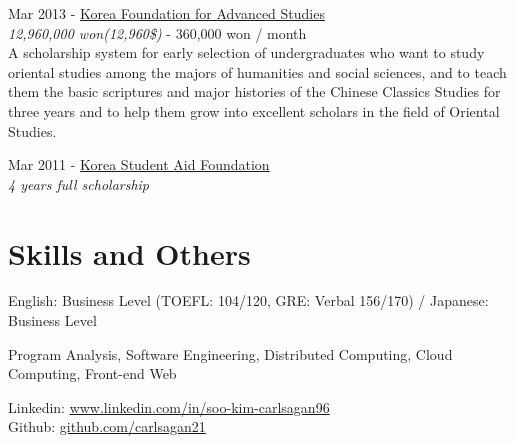 \documentclass[10pt]{article} %
\begin{document}
{
Mar 2013 - \href{http://www.kfas.or.kr/?pCulture=en}{Korea Foundation for Advanced Studies}\\
\textit{12,960,000 won(12,960\$)} - 360,000 won / month\\
A scholarship system for early selection of undergraduates who want to study oriental studies among the majors of humanities and social sciences, and to teach them the basic scriptures and major histories of the Chinese Classics Studies for three years and to help them grow into excellent scholars in the field of Oriental Studies.
}

{
Mar 2011 - \href{http://eng.kosaf.go.kr/jsp/main.jsp}{Korea Student Aid Foundation}\\
\textit{4 years full scholarship}\\
}
\fi


\section{Skills and Others}

\if{}
{
English: Business Level (TOEFL: 104/120, GRE: Verbal 156/170) / Japanese: Business Level
}
\fi

{
Program Analysis, Software Engineering, Distributed Computing, Cloud Computing, Front-end Web
}

{
Linkedin: \href{https://www.linkedin.com/in/soo-kim-carlsagan96}{www.linkedin.com/in/soo-kim-carlsagan96}\\
Github: \href{https://github.com/carlsagan21}{github.com/carlsagan21}
}

\end{document}
